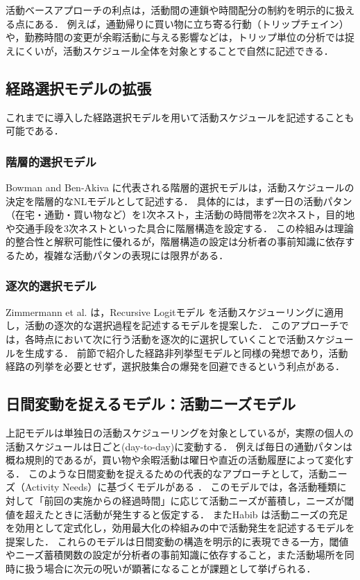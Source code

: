活動ベースアプローチの利点は，活動間の連鎖や時間配分の制約を明示的に扱える点にある．
例えば，通勤帰りに買い物に立ち寄る行動（トリップチェイン）や，勤務時間の変更が余暇活動に与える影響などは，トリップ単位の分析では捉えにくいが，活動スケジュール全体を対象とすることで自然に記述できる．

\subsection{経路選択モデルの拡張}\label{ssec:route_choice_extension}
これまでに導入した経路選択モデルを用いて活動スケジュールを記述することも可能である．

\subsubsection{階層的選択モデル}
Bowman and Ben-Akiva \cite{BOWMAN20011} に代表される階層的選択モデルは，活動スケジュールの決定を階層的なNLモデルとして記述する．
具体的には，まず一日の活動パタン（在宅・通勤・買い物など）を1次ネスト，主活動の時間帯を2次ネスト，目的地や交通手段を3次ネストといった具合に階層構造を設定する．
この枠組みは理論的整合性と解釈可能性に優れるが，階層構造の設定は分析者の事前知識に依存するため，複雑な活動パタンの表現には限界がある．

\subsubsection{逐次的選択モデル}
Zimmermann et al. \cite{ZIMMERMANN2018273} は，Recursive Logitモデル \cite{Fosgerau2013,Oyama2017dRLeng} を活動スケジューリングに適用し，活動の逐次的な選択過程を記述するモデルを提案した．
このアプローチでは，各時点において次に行う活動を逐次的に選択していくことで活動スケジュールを生成する．
前節で紹介した経路非列挙型モデルと同様の発想であり，活動経路の列挙を必要とせず，選択肢集合の爆発を回避できるという利点がある．

\subsection{日間変動を捉えるモデル：活動ニーズモデル}\label{ssec:activity_needs_model}
上記モデルは単独日の活動スケジューリングを対象としているが，実際の個人の活動スケジュールは日ごと(day-to-day)に変動する．
例えば毎日の通勤パタンは概ね規則的であるが，買い物や余暇活動は曜日や直近の活動履歴によって変化する．
このような日間変動を捉えるための代表的なアプローチとして，活動ニーズ（Activity Needs）に基づくモデルがある \cite{ARENTZE2009251, ARENTZE2011447}．
このモデルでは，各活動種類に対して「前回の実施からの経過時間」に応じて活動ニーズが蓄積し，ニーズが閾値を超えたときに活動が発生すると仮定する．
またHabib \cite{habib2008modelling} は活動ニーズの充足を効用として定式化し，効用最大化の枠組みの中で活動発生を記述するモデルを提案した．
これらのモデルは日間変動の構造を明示的に表現できる一方，閾値やニーズ蓄積関数の設定が分析者の事前知識に依存すること，また活動場所を同時に扱う場合に次元の呪いが顕著になることが課題として挙げられる．

